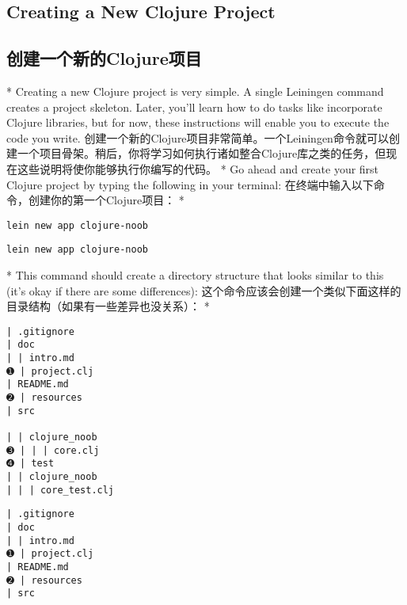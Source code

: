 \begin{paracol}{2}
\subsection{Creating a New Clojure Project}
\switchcolumn
\subsection{创建一个新的Clojure项目}
\switchcolumn[0]*
Creating a new Clojure project is very simple. A single Leiningen
command creates a project skeleton. Later, you'll learn how to do tasks
like incorporate Clojure libraries, but for now, these instructions will
enable you to execute the code you write.
\switchcolumn
创建一个新的Clojure项目非常简单。一个Leiningen命令就可以创建一个项目骨架。稍后，你将学习如何执行诸如整合Clojure库之类的任务，但现在这些说明将使你能够执行你编写的代码。
\switchcolumn[0]*
Go ahead and create your first Clojure project by typing the following
in your terminal:
\switchcolumn
在终端中输入以下命令，创建你的第一个Clojure项目：
\switchcolumn[0]*
\begin{verbatim}
lein new app clojure-noob
\end{verbatim}
\switchcolumn
\begin{verbatim}
lein new app clojure-noob
\end{verbatim}
\switchcolumn[0]*
This command should create a directory structure that looks similar to
this (it's okay if there are some differences):
\switchcolumn
这个命令应该会创建一个类似下面这样的目录结构（如果有一些差异也没关系）：
\switchcolumn[0]*
\begin{verbatim}
| .gitignore
| doc
| | intro.md
➊ | project.clj
| README.md
➋ | resources
| src

| | clojure_noob
➌ | | | core.clj
➍ | test
| | clojure_noob
| | | core_test.clj
\end{verbatim}
\switchcolumn
\begin{verbatim}
| .gitignore
| doc
| | intro.md
➊ | project.clj
| README.md
➋ | resources
| src


\end{verbatim}
\end{paracol}
